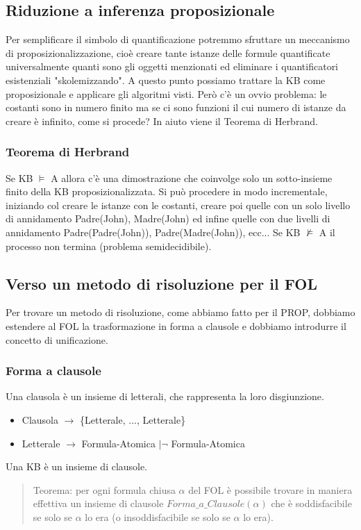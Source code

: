 \documentclass{article}
\begin{document}
\subsection{Riduzione a inferenza proposizionale}
Per semplificare il simbolo di quantificazione potremmo sfruttare un meccanismo di proposizionalizzazione, cioè creare tante istanze delle formule quantificate universalmente quanti sono gli oggetti menzionati ed eliminare i quantificatori esistenziali "skolemizzando". A questo punto possiamo trattare la KB come proposizionale e applicare gli algoritmi visti. Però c'è un ovvio problema: le costanti sono in numero finito ma se ci sono funzioni il cui numero di istanze da creare è infinito, come si procede? In aiuto viene il Teorema di Herbrand.

\subsubsection{Teorema di Herbrand} 
Se KB $\models$ A allora c'è una dimostrazione che coinvolge solo un sotto-insieme finito della KB proposizionalizzata. Si può procedere in modo incrementale, iniziando col creare le istanze con le costanti, creare poi quelle con un solo livello di annidamento Padre(John), Madre(John) ed infine quelle con due livelli di annidamento Padre(Padre(John)), Padre(Madre(John)), ecc... Se KB $\nvDash$ A il processo non termina (problema semidecidibile).

\subsection{Verso un metodo di risoluzione per il FOL}
Per trovare un metodo di risoluzione, come abbiamo fatto per il PROP, dobbiamo estendere al FOL la trasformazione in forma a clausole e dobbiamo introdurre il concetto di unificazione.

\subsubsection{Forma a clausole}
Una clausola è un insieme di letterali, che rappresenta la loro disgiunzione.
\begin{itemize}
    \item Clausola $\rightarrow$ \{Letterale, ..., Letterale\}
    \item Letterale $\rightarrow$ Formula-Atomica $| \neg$ Formula-Atomica
\end{itemize}
Una KB è un insieme di clausole.
\begin{quote}
    Teorema: per ogni formula chiusa $\alpha$ del FOL è possibile trovare in maniera effettiva un insieme di clausole $Forma\_a\_Clausole(\alpha)$ che è soddisfacibile se solo se $\alpha$ lo era (o insoddisfacibile se solo se $\alpha$ lo era).
\end{quote}
\clearpage
\end{document}
